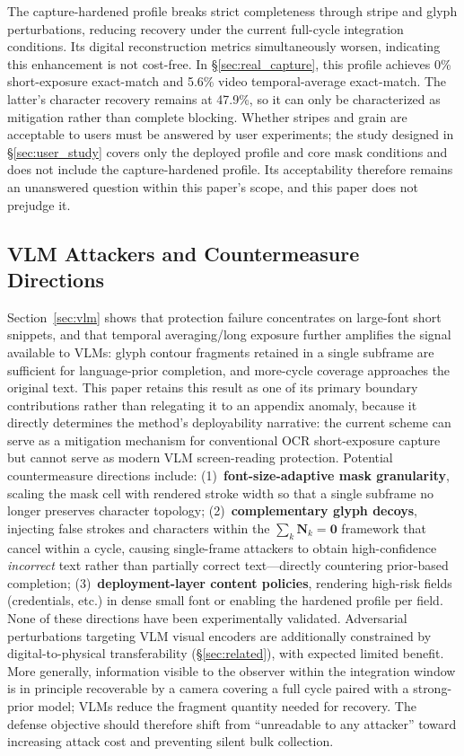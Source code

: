 \documentclass{ieeeaccess}
\begin{document}
The capture-hardened profile breaks strict completeness through stripe and glyph perturbations, reducing recovery under the current full-cycle integration conditions. Its digital reconstruction metrics simultaneously worsen, indicating this enhancement is not cost-free. In \S\ref{sec:real_capture}, this profile achieves 0\% short-exposure exact-match and 5.6\% video temporal-average exact-match. The latter's character recovery remains at 47.9\%, so it can only be characterized as mitigation rather than complete blocking. Whether stripes and grain are acceptable to users must be answered by user experiments; the study designed in \S\ref{sec:user_study} covers only the deployed profile and core mask conditions and does not include the capture-hardened profile. Its acceptability therefore remains an unanswered question within this paper's scope, and this paper does not prejudge it.

\subsection{VLM Attackers and Countermeasure Directions}
\label{sec:vlm_defense}

Section~\ref{sec:vlm} shows that protection failure concentrates on large-font short snippets, and that temporal averaging/long exposure further amplifies the signal available to VLMs: glyph contour fragments retained in a single subframe are sufficient for language-prior completion, and more-cycle coverage approaches the original text. This paper retains this result as one of its primary boundary contributions rather than relegating it to an appendix anomaly, because it directly determines the method's deployability narrative: the current scheme can serve as a mitigation mechanism for conventional OCR short-exposure capture but cannot serve as modern VLM screen-reading protection. Potential countermeasure directions include: (1)~\textbf{font-size-adaptive mask granularity}, scaling the mask cell with rendered stroke width so that a single subframe no longer preserves character topology; (2)~\textbf{complementary glyph decoys}, injecting false strokes and characters within the $\sum_{k}\mathbf{N}_k=\mathbf{0}$ framework that cancel within a cycle, causing single-frame attackers to obtain high-confidence \emph{incorrect} text rather than partially correct text---directly countering prior-based completion; (3)~\textbf{deployment-layer content policies}, rendering high-risk fields (credentials, etc.) in dense small font or enabling the hardened profile per field. None of these directions have been experimentally validated. Adversarial perturbations targeting VLM visual encoders are additionally constrained by digital-to-physical transferability (\S\ref{sec:related}), with expected limited benefit. More generally, information visible to the observer within the integration window is in principle recoverable by a camera covering a full cycle paired with a strong-prior model; VLMs reduce the fragment quantity needed for recovery. The defense objective should therefore shift from ``unreadable to any attacker'' toward increasing attack cost and preventing silent bulk collection.
\end{document}
